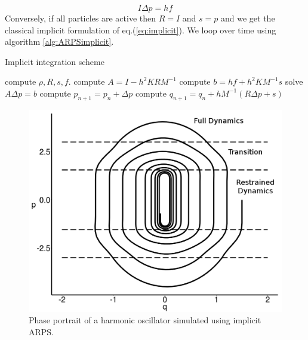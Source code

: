 \begin{equation}
    \label{eq:ARPSImplicitRestrained}
    I \Delta p = h f
\end{equation}
Conversely, if all particles are active then $R = I$ and $s = p$ and we get the classical implicit formulation of eq.(\ref{eq:implicit}).
We loop over time using algorithm \ref{alg:ARPSimplicit}.
\begin{algorithm}[H]
    \caption[ARPS: Implicit integration scheme]{Implicit integration scheme}
    \label{alg:ARPSimplicit}
    \begin{algorithmic}[10]
	    \State compute $\rho, R, s, f$.
	    \State compute $A = I - h^{2}KRM^{-1}$
	    \State compute $b = h f + h^{2}KM^{-1}s$
	    \State solve $A \Delta p = b$
            \State compute $p_{n+1} = p_{n} + \Delta p$
	    \State compute $\displaystyle q_{n+1} = q_{n} +
            hM^{-1}\left( R\Delta p+ s \right)$
	\EndFor
    \end{algorithmic}
\end{algorithm}
\begin{figure}[htb]
  \centering
  \includegraphics[width=1.0\linewidth]{images/arps-vriphys2013/implicitHOPPraw.jpeg}
  \caption[ARPS: Phase portrait of an implicit ARPS harmonic oscillator]{\label{fig:implicitHOPP} Phase portrait of a harmonic oscillator simulated using implicit ARPS.}
\end{figure}

